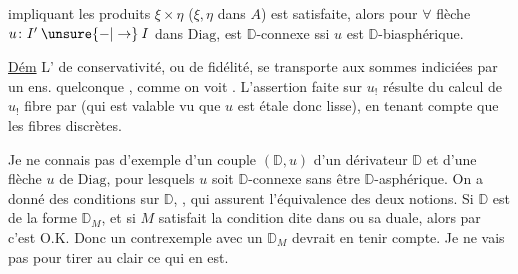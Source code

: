 impliquant les produits $\xi\times\eta$ ($\xi,\eta$ dans $A$) est satisfaite, alors pour $\forall$ flèche $u\colon I'\mathbin{\unsure{-|\to}}I$ dans $\mathrm{Diag}$,  est $\mathbb{D}$-connexe ssi $u$ est $\mathbb{D}$-biasphérique.

\uline{Dém} L' de conservativité, ou de fidélité, se transporte aux sommes indiciées par un ens.  quelconque , comme on voit . L'assertion faite sur $u_!$ résulte  du calcul de $u_!$ fibre par  (qui est valable vu que $u$ est étale donc lisse), en tenant compte que les fibres  discrètes.

Je ne connais pas d'exemple d'un couple $(\mathbb{D},u)$ d'un dérivateur $\mathbb{D}$ et d'une flèche $u$ de $\mathrm{Diag}$, pour lesquels $u$ soit $\mathbb{D}$-connexe sans être $\mathbb{D}$-asphérique. On a donné des conditions sur $\mathbb{D}$, , qui assurent l'équivalence des deux notions. Si $\mathbb{D}$ est de la forme $\mathbb{D}_M$, et si  $M$ satisfait la condition dite dans  ou sa duale, alors par  c'est O.K. Donc un contrexemple avec un $\mathbb{D}_M$ devrait en tenir compte. Je ne vais pas  pour tirer au clair ce qui en est.
